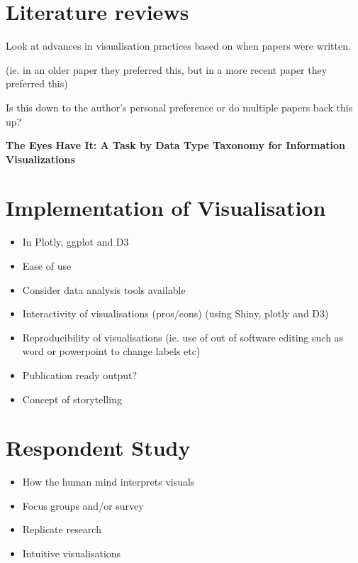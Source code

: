 \documentclass[12pt]{book}
\begin{document}
    \section{Literature reviews}
    Look at advances in visualisation practices based on when papers were written.
    
    \noindent (ie. in an older paper they preferred this, but in a more recent paper they preferred this)
    
    \noindent Is this down to the author's personal preference or do multiple papers back this up?
    
    \vspace{1.2cm}
    \noindent \textbf{The Eyes Have It: A Task by Data Type Taxonomy for Information Visualizations}
    
    \section{Implementation of Visualisation}
    \begin{itemize}
    \item In Plotly, ggplot and D3
    \item Ease of use
    \item Consider data analysis tools available
    \item Interactivity of visualisations (pros/cons) (using Shiny, plotly and D3) 
    \item Reproducibility of visualisations (ie. use of out of software editing such as word or powerpoint to change labels etc)
    \item Publication ready output?
    \item Concept of storytelling
    \end{itemize}
    
    \section{Respondent Study}
    
    \begin{itemize}
    \item How the human mind interprets visuals
    \item Focus groups and/or survey
    \item Replicate research
    \item Intuitive visualisations
    \end{itemize}


    
    
    
    

    
    
\end{document}
